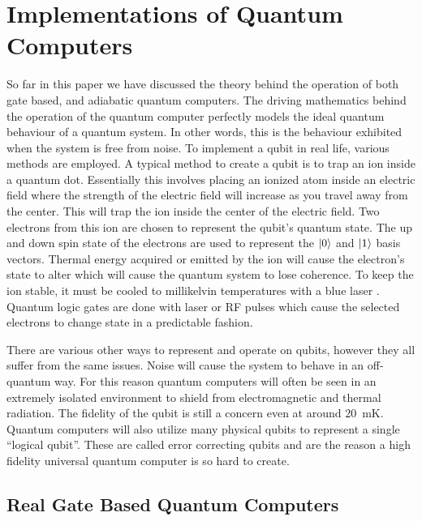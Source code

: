 \documentclass[conference]{IEEEtran}
\begin{document}
\section{Implementations of Quantum Computers}

So far in this paper we have discussed the theory behind the operation of both gate based, and adiabatic quantum computers. The driving mathematics behind the operation of the quantum computer perfectly models the ideal quantum behaviour of a quantum system. In other words, this is the behaviour exhibited when the system is free from noise. To implement a qubit in real life, various methods are employed. A typical method to create a qubit is to trap an ion inside a quantum dot. Essentially this involves placing an ionized atom inside an electric field where the strength of the electric field will increase as you travel away from the center. This will trap the ion inside the center of the electric field. Two electrons from this ion are chosen to represent the qubit's quantum state. The up and down spin state of the electrons are used to represent the $\ket{0}$ and $\ket{1}$ basis vectors. Thermal energy acquired or emitted by the ion will cause the electron's state to alter which will cause the quantum system to lose coherence. To keep the ion stable, it must be cooled to millikelvin temperatures with a blue laser \cite{b1}. Quantum logic gates are done with laser or RF pulses which cause the selected electrons to change state in a predictable fashion. 

There are various other ways to represent and operate on qubits, however they all suffer from the same issues. Noise will cause the system to behave in an off-quantum way. For this reason quantum computers will often be seen in an extremely isolated environment to shield from electromagnetic and thermal radiation. The fidelity of the qubit is still a concern even at around \SI{20}{\milli\kelvin}. Quantum computers will also utilize many physical qubits to represent a single ``logical qubit''. These are called error correcting qubits and are the reason a high fidelity universal quantum computer is so hard to create.

\subsection{Real Gate Based Quantum Computers}
\end{document}
